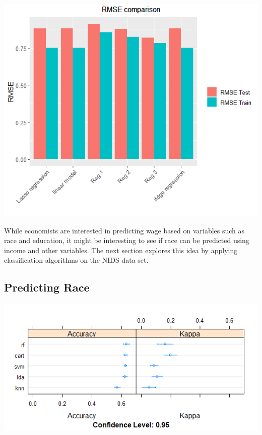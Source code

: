 \documentclass[11pt,preprint, authoryear]{elsarticle}
\let\origfigure\figure
\let\endorigfigure\endfigure
\renewenvironment{figure}[1][2] {
    \expandafter\origfigure\expandafter[H]
} {
    \endorigfigure
}
\numberwithin{equation}{section}
\numberwithin{figure}{section}
\numberwithin{table}{section}
\begin{document}
\begin{figure}
\centering
\includegraphics{"images/RMSE.png"}
\caption{RMSE comparison}
\end{figure}

While economists are interested in predicting wage based on variables
such as race and education, it might be interesting to see if race can
be predicted using income and other variables. The next section explores
this idea by applying classification algorithms on the NIDS data set.

\hypertarget{predicting-race}{%
\subsection{\texorpdfstring{Predicting Race
\label{race}}{Predicting Race }}\label{predicting-race}}

\begin{figure}
\centering
\includegraphics{"images/unbal.png"}
\caption{Machine Learning applied to unbalanced data}
\end{figure}
\end{document}

